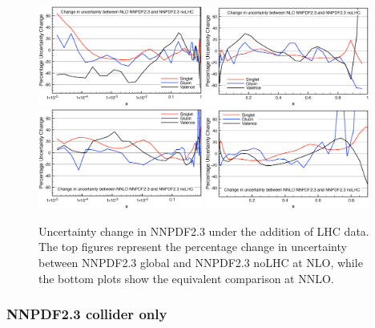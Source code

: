 \begin{figure}[h!]
\centering
\includegraphics[width=0.48\textwidth]{6-LHCimpact/figs/NLOlogUnc.eps}
\includegraphics[width=0.48\textwidth]{6-LHCimpact/figs/NLOlinUnc.eps}\\
\includegraphics[width=0.48\textwidth]{6-LHCimpact/figs/NNLOlogUnc.eps}
\includegraphics[width=0.48\textwidth]{6-LHCimpact/figs/NNLOlinUnc.eps}
\caption[Uncertainty change in NNPDF2.3 under the addition of LHC data]{Uncertainty change in NNPDF2.3 under the addition of LHC data. The top figures represent the percentage change in uncertainty between NNPDF2.3 global and NNPDF2.3 noLHC at NLO, while the bottom plots show the equivalent comparison at NNLO.}
\label{fig:23vs23noLHCunc}
\end{figure}



\subsubsection{NNPDF2.3 collider only}

